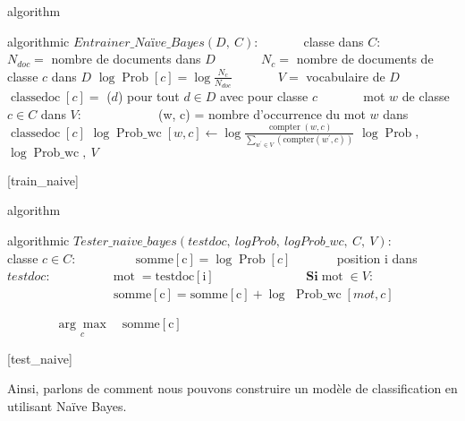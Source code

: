 \documentclass[letterpaper,11pt,english]{sphinxmanual}
\begin{document}
\begin{sphinxuseclass}{algorithm}
\begin{sphinxuseclass}{algorithmic}
\sphinxAtStartPar
{} \(Entrainer\_Naïve\_Bayes(D,\ C)\):         classe dans \(C\):        \(N_{doc}=\) nombre de
documents dans \(D\)        \(N_{c}=\) nombre de documents
de classe \(c\) dans \(D\)
\(\log \operatorname{Prob}[c]= \log\frac{N_c}{N_{doc}}\)
       \(V=\) vocabulaire de \(D\)
\(\operatorname{classedoc}[c]=\) (\(d\)) pour
tout \(d\in D\) avec pour classe \(c\)         mot \(w\) de classe \(c \in C\) dans \(V\):
            (w, c) = nombre d’occurrence du mot
\(w\) dans \(\operatorname{classedoc}[c]\)
\(\log \operatorname{Prob\_wc} [w, c] \leftarrow \log \frac{\operatorname{compter}(w, c)}{\sum_{w^{\prime} \in V} \left(\text {compter}\left(w^{\prime}, c\right)\right)}\)
 \(\log \operatorname{Prob}\),
\(\log \operatorname{Prob\_wc},\ V\)

\end{sphinxuseclass}
\sphinxAtStartPar
{[}train\_naive{]}

\end{sphinxuseclass}
\begin{sphinxuseclass}{algorithm}
\begin{sphinxuseclass}{algorithmic}
\sphinxAtStartPar
{}
\(Tester\_naive\_bayes(testdoc,\ logProb,\ logProb\_wc,\ C,\ V)\):
       classe \(c \in C\):
         \(\operatorname{somme[c]} = \log \operatorname{Prob}[c]\)
       position i dans \(testdoc\):
         \(\operatorname{mot} = \operatorname{testdoc[i]}\)
              \(\textbf{Si} \operatorname{mot} \in V:\)
                 \(\operatorname{somme[c]}=\operatorname{somme[c]}+\log\)
\(\operatorname{Prob\_wc}[mot, c]\)

\sphinxAtStartPar
\(\underset{c}{\arg\max} \quad \operatorname{somme[c]}\)

\end{sphinxuseclass}
\sphinxAtStartPar
{[}test\_naive{]}

\end{sphinxuseclass}
\sphinxAtStartPar
Ainsi, parlons de comment nous pouvons construire un modèle de
classification en utilisant Naïve Bayes.
\end{document}
